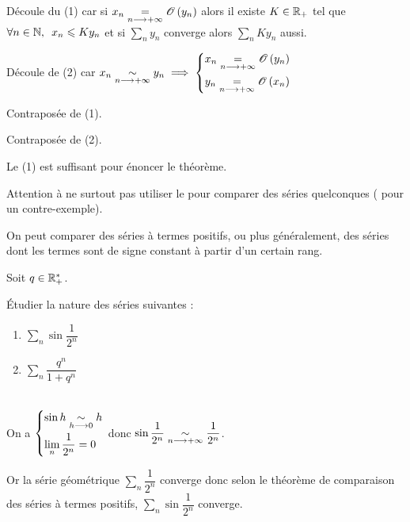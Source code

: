 \begin{dem}[2]
Découle du (1) car si \(x_n\underset{n\longrightarrow+\infty}{=}\mathscr{O}\left(y_n\right)\) alors il existe \(K\in\mathbb{R}_+\) tel que \(\quantifs{\forall n\in\N}x_n\leq Ky_n\) et si \(\sum_ny_n\) converge alors \(\sum_nKy_n\) aussi.
\end{dem}

\begin{dem}[3]
Découle de (2) car \(x_n\underset{n\longrightarrow+\infty}{\sim}y_n\implies\begin{dcases}
x_n\underset{n\longrightarrow+\infty}{=}\mathscr{O}\left(y_n\right) \\
y_n\underset{n\longrightarrow+\infty}{=}\mathscr{O}\left(x_n\right)
\end{dcases}\)
\end{dem}

\begin{dem}[4]
Contraposée de (1).
\end{dem}

\begin{dem}[5]
Contraposée de (2).
\end{dem}

\begin{rem}
Le (1) est suffisant pour énoncer le théorème.
\end{rem}

\begin{rem}
Attention à ne surtout pas utiliser le  pour comparer des séries quelconques (\cf {} pour un contre-exemple).

On peut comparer des séries à termes positifs, ou plus généralement, des séries dont les termes sont de signe constant à partir d'un certain rang.
\end{rem}

\begin{exoex}
Soit \(q\in\mathbb{R}_+^*\).

Étudier la nature des séries suivantes :

\begin{enumerate}
    \item \(\sum_n\sin\dfrac{1}{2^n}\) \\
    \item \(\sum_n\dfrac{q^n}{1+q^n}\)
\end{enumerate}
\end{exoex}

\begin{corr}[1]~\\
On a \(\begin{dcases}
\sin h\underset{h\longrightarrow0}{\sim}h \\
\lim_n\dfrac{1}{2^n}=0
\end{dcases}\) donc \(\sin\dfrac{1}{2^n}\underset{n\longrightarrow+\infty}{\sim}\dfrac{1}{2^n}\).

Or la série géométrique \(\sum_n\dfrac{1}{2^n}\) converge donc selon le théorème de comparaison des séries à termes positifs, \(\sum_n\sin\dfrac{1}{2^n}\) converge.
\end{corr}

